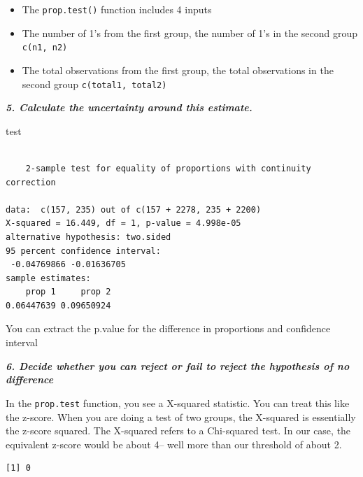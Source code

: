 \documentclass[
  letterpaper,
  DIV=11,
  numbers=noendperiod]{scrreprt}
\newenvironment{Shaded}{\begin{snugshade}}{\end{snugshade}}
\newcommand{\AttributeTok}[1]{\textcolor[rgb]{0.40,0.45,0.13}{#1}}
\newcommand{\DecValTok}[1]{\textcolor[rgb]{0.68,0.00,0.00}{#1}}
\newcommand{\FunctionTok}[1]{\textcolor[rgb]{0.28,0.35,0.67}{#1}}
\newcommand{\NormalTok}[1]{\textcolor[rgb]{0.00,0.23,0.31}{#1}}
\newcommand{\SpecialCharTok}[1]{\textcolor[rgb]{0.37,0.37,0.37}{#1}}
\providecommand{\tightlist}{%
  \setlength{\itemsep}{0pt}\setlength{\parskip}{0pt}}\usepackage{longtable,booktabs,array}
\begin{document}
\begin{itemize}
\tightlist
\item
  The \texttt{prop.test()} function includes 4 inputs
\item
  The number of 1's from the first group, the number of 1's in the
  second group \texttt{c(n1,\ n2)}
\item
  The total observations from the first group, the total observations in
  the second group \texttt{c(total1,\ total2)}
\end{itemize}

\textbf{\emph{5. Calculate the uncertainty around this estimate.}}

\begin{Shaded}
\begin{Highlighting}[]
\NormalTok{test}
\end{Highlighting}
\end{Shaded}

\begin{verbatim}

    2-sample test for equality of proportions with continuity correction

data:  c(157, 235) out of c(157 + 2278, 235 + 2200)
X-squared = 16.449, df = 1, p-value = 4.998e-05
alternative hypothesis: two.sided
95 percent confidence interval:
 -0.04769866 -0.01636705
sample estimates:
    prop 1     prop 2 
0.06447639 0.09650924 
\end{verbatim}

You can extract the p.value for the difference in proportions and
confidence interval

\textbf{\emph{6. Decide whether you can reject or fail to reject the
hypothesis of no difference}}

In the \texttt{prop.test} function, you see a X-squared statistic. You
can treat this like the z-score. When you are doing a test of two
groups, the X-squared is essentially the z-score squared. The X-squared
refers to a Chi-squared test. In our case, the equivalent z-score would
be about 4-- well more than our threshold of about 2.

\begin{Shaded}
\end{Shaded}

\begin{verbatim}
[1] 0
\end{verbatim}
\end{document}
